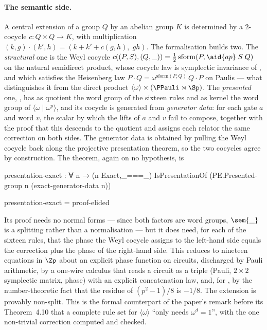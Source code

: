 \paragraph{The semantic side.}  A central extension of a group $Q$ by
an abelian group $K$ is determined by a 2-cocycle $c : Q \times Q \to
K$, with multiplication $(k, g)\cdot(k', h) = (k + k' + c(g,h),\; gh)$.
The formalisation builds two.  The \emph{structural} one is the Weyl
cocycle $c((P,S),(Q,\_)) = \tfrac12\,\mathrm{sform}(P, \aid{ap}\;S\;Q)$
on the natural semidirect product, whose cocycle law is symplectic
invariance of , and which
satisfies the Heisenberg law $P \cdot Q = \omega^{\mathrm{sform}(P,Q)}
\, Q \cdot P$ on Paulis --- what distinguishes it from the direct product
$\langle\omega\rangle \times (\PPauli \rtimes \Sp)$.  The
\emph{presented} one, , has as quotient the word
group of the sixteen rules and as kernel the word group of
$\langle\omega \mid \omega^{p}\rangle$, and its cocycle is generated
from \emph{generator data}: for each gate $a$ and word $v$, the scalar
by which the lifts of $a$ and $v$ fail to compose, together with the
proof that this descends to the quotient and assigns each relator the
same correction on both sides.  The generator data is obtained by pulling
the Weyl cocycle back along the projective presentation theorem, so the
two cocycles agree by construction.  The theorem, again on no hypothesis,
is

\begingroup\renewcommand{\AgdaCodeStyle}{\footnotesize}
\begin{code}
presentation-exact : ∀ n → (n Exact,_===_) IsPresentationOf (PE.Presented-group n (exact-generator-data n))
\end{code}
\endgroup
\begin{code}[hide]
presentation-exact = proof-elided
\end{code}

Its proof needs no normal forms --- since both factors are word groups,
$\sem{\_}$ is a splitting rather than a normalisation --- but it does
need, for each of the sixteen rules, that the phase the Weyl cocycle
assigns to the left-hand side equals the correction plus the phase of
the right-hand side.  This reduces to nineteen equations in $\Zp$ about
an explicit phase function on circuits, discharged by Pauli arithmetic,
by a one-wire calculus that reads a circuit as a triple (Pauli, $2
\times 2$ symplectic matrix, phase) with an explicit concatenation law,
and, for , by the number-theoretic fact that the residue
of $(p^2-1)/8$ is $-1/8$.  The extension is provably non-split.  This
is the formal counterpart of the paper's remark before its Theorem~4.10
that a complete rule set for $\langle\omega\rangle$ ``only needs
$\omega^{d} = 1$'', with the one non-trivial correction computed and
checked.

